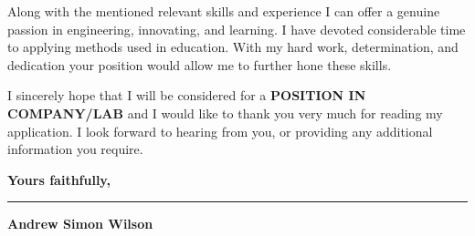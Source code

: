\documentclass[11pt,a4paper,withhyper]{altacv}
\begin{document}

Along with the mentioned relevant skills and experience I can offer a genuine passion in engineering, innovating, and learning. I have devoted considerable time to applying methods used in education. With my hard work, determination, and dedication your position would allow me to further hone these skills. \linebreak

I sincerely hope that I will be considered for a \textbf{\color{accent}\MakeUppercase{position in company/lab}} and I would like to thank you very much for reading my application. I look forward to hearing from you, or providing any additional information you require. \linebreak


\textbf{Yours faithfully,}\\
\vspace{3mm}

{\color{headingrule}\rule{6cm}{1pt}\par} 
\vspace{1mm}
\large\textbf{\color{tagline}Andrew Simon Wilson}
\end{document}
